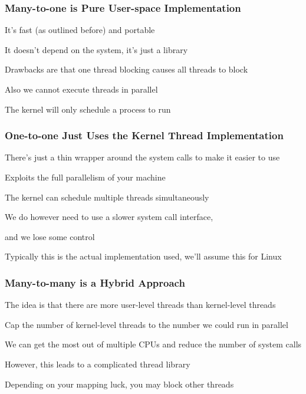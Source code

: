   \begin{frame}
    \frametitle{Many-to-one is Pure User-space Implementation}

    It's fast (as outlined before) and portable

    \hspace{2em} It doesn't depend on the system, it's just a library

    \vspace{2em}

    Drawbacks are that one thread blocking causes all threads to block

    \hspace{2em} Also we cannot execute threads in parallel

    \hspace{4em} The kernel will only schedule a process to run
  \end{frame}

  \begin{frame}
    \frametitle{One-to-one Just Uses the Kernel Thread Implementation}

    There's just a thin wrapper around the system calls to make it easier to use

    \vspace{2em}

    Exploits the full parallelism of your machine

    \hspace{2em} The kernel can schedule multiple threads simultaneously

    \vspace{2em}

    We do however need to use a slower system call interface,
    
    \hspace{2em} and we lose some control

    \vspace{4em}

    Typically this is the actual implementation used, we'll assume this for
    Linux
  \end{frame}

  \begin{frame}
    \frametitle{Many-to-many is a Hybrid Approach}

    The idea is that there are more user-level threads than kernel-level threads

    \hspace{2em} Cap the number of kernel-level threads to the number we could
    run in parallel

    \vspace{2em}

    We can get the most out of multiple CPUs and reduce the number of system
    calls

    \vspace{2em}

    However, this leads to a complicated thread library

    \hspace{2em} Depending on your mapping luck, you may block other threads
  \end{frame}

